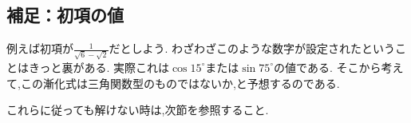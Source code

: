     \subsection{補足：初項の値}
      例えば初項が$\displaystyle \frac{1}{\sqrt{6}-\sqrt{2}}$だとしよう.
      わざわざこのような数字が設定されたということはきっと裏がある.
      実際これは$\cos 15^\circ$または$\sin 75^\circ$の値である.
      そこから考えて,この漸化式は三角関数型のものではないか,と予想するのである.
    
    これらに従っても解けない時は,次節を参照すること.
 

